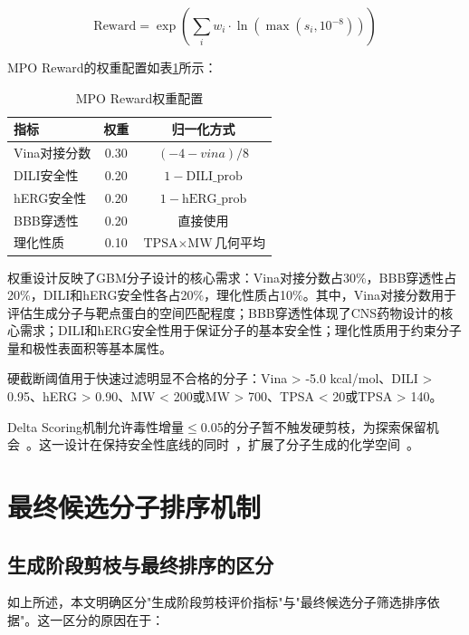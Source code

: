 \begin{equation}
    \text{Reward} = \exp\left(\sum_{i} w_i \cdot \ln(\max(s_i, 10^{-8}))\right)
\end{equation}

MPO Reward的权重配置如表\ref{tab:mpo-weights}所示：

\begin{table}[htbp]
    \centering
    \caption{MPO Reward权重配置}\label{tab:mpo-weights}
    \begin{tabular}{lcc}
        \toprule
        \textbf{指标} & \textbf{权重} & \textbf{归一化方式} \\
        \midrule
        Vina对接分数 & 0.30 & $(-4 - vina) / 8$ \\
        DILI安全性 & 0.20 & $1 - \text{DILI\_prob}$ \\
        hERG安全性 & 0.20 & $1 - \text{hERG\_prob}$ \\
        BBB穿透性 & 0.20 & 直接使用 \\
        理化性质 & 0.10 & $\text{TPSA} \times \text{MW}$几何平均 \\
        \bottomrule
    \end{tabular}
\end{table}

权重设计反映了GBM分子设计的核心需求：Vina对接分数占30\%，BBB穿透性占20\%，DILI和hERG安全性各占20\%，理化性质占10\%。其中，Vina对接分数用于评估生成分子与靶点蛋白的空间匹配程度；BBB穿透性体现了CNS药物设计的核心需求；DILI和hERG安全性用于保证分子的基本安全性；理化性质用于约束分子量和极性表面积等基本属性。

硬截断阈值用于快速过滤明显不合格的分子：Vina > -5.0 kcal/mol、DILI > 0.95、hERG > 0.90、MW < 200或MW > 700、TPSA < 20或TPSA > 140。

Delta Scoring机制允许毒性增量$\le$0.05的分子暂不触发硬剪枝，为探索保留机会~\cite{Zhou2019Exp}。这一设计在保持安全性底线的同时~\cite{Zhou2019Exp}，扩展了分子生成的化学空间~\cite{Zhou2019Exp}。

\section{最终候选分子排序机制}\label{sec:final-ranking}

\subsection{生成阶段剪枝与最终排序的区分}

如上所述，本文明确区分"生成阶段剪枝评价指标"与"最终候选分子筛选排序依据"。这一区分的原因在于：

